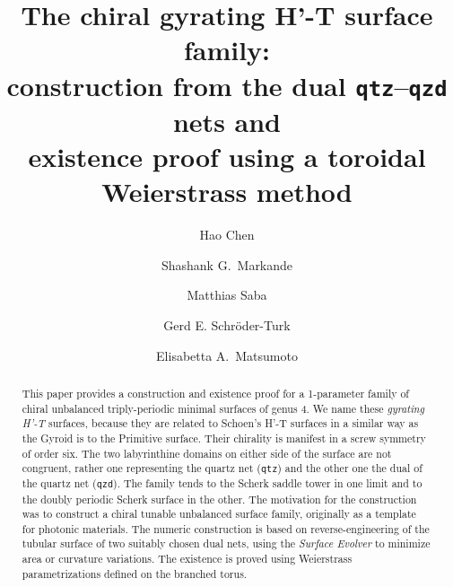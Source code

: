 \documentclass[a4paper]{amsart}
\theoremstyle{plain}
\theoremstyle{definition}
\begin{document}
\title[Gyrating H'-T surfaces]{The chiral gyrating H'-T surface family:\\ construction from the dual \texttt{qtz}--\texttt{qzd} nets and\\ existence proof using a toroidal Weierstrass method}

\author{Hao Chen}
\author{Shashank G.\ Markande}

\author{Matthias Saba}

\author{Gerd E. Schr\"oder-Turk}

\author{Elisabetta A.\ Matsumoto}
\address[Chen]{ShanghaiTech University, Institute of Mathematical Sciences, 201210  Pudong New District, Shanghai, China}
\address[Markande, Matsumoto]{School of Physics, Georgia Tech, Atlanta, GA 30318, USA}
\address[Saba]{Adolphe Merkle Institute, University of Fribourg, 1700, Switzerland}
\address[Schr\"oder-Turk]{Murdoch University, School of Mathematics, Statistics, Chemistry and Physics, Perth, Australia; The Australian National University; Research School of Physics, Department of Materials Science, Canberra, Australia}


\begin{abstract}
	This paper provides a construction and existence proof for a 1-parameter family
	of chiral unbalanced triply-periodic minimal surfaces of genus 4. We name these
	{\textit{gyrating H'-T} surfaces, because they are related to Schoen's H'-T
		surfaces in a similar way as the Gyroid is to the Primitive surface. Their
		chirality is manifest in a screw symmetry of order six. The two labyrinthine
		domains on either side of the surface are not congruent, rather one
		representing the quartz net (\texttt{qtz}) and the other one the dual of the
		quartz net (\texttt{qzd}). The family tends to the Scherk saddle tower in one
		limit and to the doubly periodic Scherk surface in the other. The motivation
		for the construction was to construct a chiral tunable unbalanced surface
		family, originally as a template for photonic materials. The numeric
		construction is based on reverse-engineering of the tubular surface of two
	suitably chosen dual nets, using the \textit{Surface Evolver}} to minimize area
	or curvature variations.  The existence is proved using Weierstrass
	parametrizations defined on the branched torus. 
\end{abstract}
\end{document}
